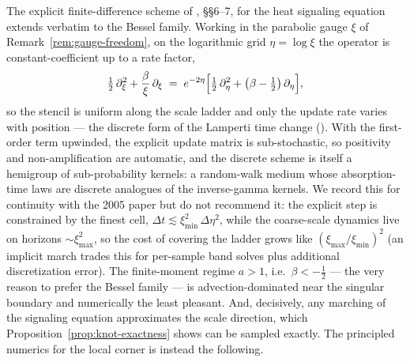 \begin{remark}\label{rem:finite-differences}
The explicit finite-difference scheme of , \S\S6--7, for the
heat signaling equation extends verbatim to the Bessel family. Working in the parabolic gauge
$\xi$ of Remark~\ref{rem:gauge-freedom}, on the logarithmic grid $\eta = \log\xi$ the operator
is constant-coefficient up to a rate factor,
\[
  \tfrac12\,\partial_\xi^2 + \frac{\beta}{\xi}\,\partial_\xi
  \;=\; e^{-2\eta}\Bigl[\tfrac12\,\partial_\eta^2 + \bigl(\beta - \tfrac12\bigr)\,\partial_\eta\Bigr],
\]
so the stencil is uniform along the scale ladder and only the update rate varies with
position --- the discrete form of the Lamperti time change (). With
the first-order term upwinded, the explicit update matrix is sub-stochastic, so positivity
and non-amplification are automatic, and the discrete scheme is itself a hemigroup of
sub-probability kernels: a random-walk medium whose absorption-time laws are discrete
analogues of the inverse-gamma kernels. We record this for continuity with the 2005 paper but
do not recommend it: the explicit step is constrained by the finest cell,
$\Delta t \lesssim \xi_{\min}^2\,\Delta\eta^2$, while the coarse-scale dynamics live on
horizons $\sim \xi_{\max}^2$, so the cost of covering the ladder grows like
$(\xi_{\max}/\xi_{\min})^2$ (an implicit march trades this for per-sample band solves plus
additional discretization error). The
finite-moment regime $a > 1$, i.e.\ $\beta < -\tfrac12$ --- the very reason to prefer the
Bessel family --- is advection-dominated near the singular boundary and numerically the least
pleasant. And, decisively, any marching of the signaling equation approximates the scale
direction, which Proposition~\ref{prop:knot-exactness} shows can be sampled exactly. The
principled numerics for the local corner is instead the following.
\end{remark}


